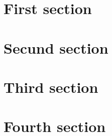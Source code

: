 \documentclass[a4paper]{article}
\begin{document}
\section{First section}

\lipsum[1-10]


\section{Secund section}

\lipsum[1-10]


\section{Third section}

\lipsum[1-10]


\section{Fourth section}

\lipsum[1-10]
\end{document}
